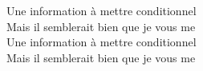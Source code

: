 \songwordfb{ } Une information à mettre  conditionnel \\
\songwordfb{ } Mais il semblerait bien que je vous me \\
\songwordfb{ } Une information à mettre  conditionnel \\
\songwordfb{ } Mais il semblerait bien que je vous me \\
